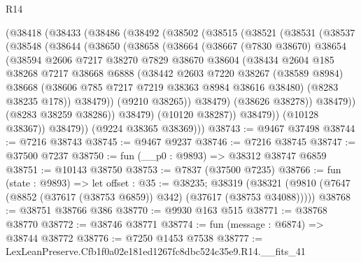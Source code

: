 \begin{lexlean}{R14}
\begin{coremodule}
    (@38418
      (@38433
        (@38486
          (@38492
            (@38502
              (@38515
                (@38521
                  (@38531
                    (@38537
                      (@38548
                        (@38644
                          (@38650
                            (@38658
                              (@38664
                                (@38667
                                  (@7830 @38670)
                                  @38654
                                  (@38594
                                    @2606
                                    @7217
                                    @38270
                                    @7829
                                    @38670
                                    @38604
                                    (@38434
                                      @2604
                                      @185
                                      @38268
                                      @7217
                                      @38668
                                      @6888
                                      (@38442
                                        @2603
                                        @7220
                                        @38267
                                        (@38589 @8984)
                                        @38668
                                        (@38606 @785 @7217 @7219 @38363 @8984 @38616 @38480)
                                        (@8283 @38235 @178))
                                      @38479))
                                  (@9210 @38265))
                                @38479)
                              (@38626 @38278))
                            @38479))
                        (@8283 @38259 @38286))
                      @38479)
                    (@10120 @38287))
                  @38479))
              (@10128 @38367))
            @38479))
        (@9224 @38365 @38369)))
@38743 := @9467 @37498
@38744 := @7216 @38743
@38745 := @9467 @9237
@38746 := @7216 @38745
@38747 := @37500 @7237
@38750 := fun (__p0 : @9893) => @38312 @38747 @6859
@38751 := @10143 @38750
@38753 := @7837 (@37500 @7235)
@38766 := fun (state : @9893) =>
  let offset : @35 := @38235;
  @38319 (@38321 (@9810 (@7647 (@8852 (@37617 (@38753 @6859)) @342) (@37617 (@38753 @34088)))))
@38768 := @38751 @38766 @386
@38770 := @9930 @163 @515
@38771 := @38768 @38770
@38772 := @38746 @38771
@38774 := fun (message : @6874) => @38744 @38772
@38776 := @7250 @1453 @7538
@38777 := LexLeanPreserve.Cfb1f0a02e181ed1267fc8dbc524c35e9.R14.__fits_41

\end{coremodule}
\end{lexlean}
